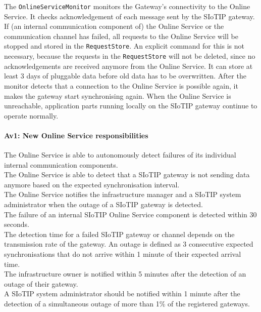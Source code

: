             The \texttt{OnlineServiceMonitor} monitors the Gateway's connectivity to the Online Service. It checks acknowledgement of each
            message sent by the SIoTIP gateway. If (an internal communication component of) the Online Service or the communication
            channel has failed, all requests to the Online Service will be stopped and stored in the \texttt{RequestStore}. An explicit command for this is not necessary,
            because the requests in the \texttt{RequestStore} will not be deleted, since no acknowledgements are received
            anymore from the Online Service. It can store at least 3 days of pluggable data before old data has to be overwritten.
            After the monitor detects that a connection to the Online Service is possible
            again, it makes the gateway start synchronising again. When the Online Service is unreachable, application
            parts running locally on the SIoTIP gateway continue to operate normally.


        \paragraph{Av1: New Online Service responsibilities}
            The Online Service is able to autonomously detect failures of its individual internal communication components.\\
            The Online Service is able to detect that a SIoTIP gateway is not sending data anymore based on the expected synchronisation interval.\\
            The Online Service notifies the infrastructure manager and a SIoTIP system administrator when the outage of a SIoTIP gateway is detected.\\
            The failure of an internal SIoTIP Online Service component is detected within 30 seconds.\\
            The detection time for a failed SIoTIP gateway or channel depends on the transmission rate
            of the gateway. An outage is defined as 3 consecutive expected synchronisations that do not
            arrive within 1 minute of their expected arrival time.\\
            The infrastructure owner is notified within 5 minutes after the detection of an outage of their gateway.\\
            A SIoTIP system administrator should be notified within 1 minute after the detection
            of a simultaneous outage of more than 1\% of the registered gateways.\\

